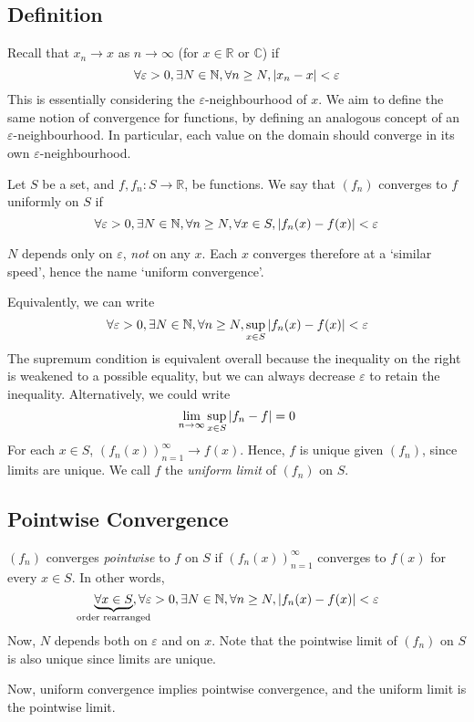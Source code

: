 \subsection{Definition}
Recall that \( x_n \to x \) as \( n \to \infty \) (for \( x \in \mathbb R\) or \(\mathbb C\)) if
\[ \forall \varepsilon > 0, \exists N \in \mathbb N, \forall n \geq N, \abs{x_n-x} < \varepsilon \]
This is essentially considering the \( \varepsilon \)-neighbourhood of \( x \).
We aim to define the same notion of convergence for functions, by defining an analogous concept of an \( \varepsilon \)-neighbourhood.
In particular, each value on the domain should converge in its own \( \varepsilon \)-neighbourhood.
\begin{definition}
Let \( S \) be a set, and \( f, f_n \colon S \to \mathbb R \), be functions.
We say that \( (f_n) \) converges to \( f \) uniformly on \( S \) if
\[ \forall \varepsilon > 0, \exists N \in \mathbb N, \forall n \geq N, \forall x \in S, \abs{f_n(x) - f(x)} < \varepsilon \]
\end{definition}
\begin{note}
\( N \) depends only on \( \varepsilon \), \textit{not} on any \( x \).
Each \( x \) converges therefore at a `similar speed', hence the name `uniform convergence'.
\end{note}
Equivalently, we can write
\[ \forall \varepsilon > 0, \exists N \in \mathbb N, \forall n \geq N, \sup_{x \in S} \abs{f_n(x) - f(x)} < \varepsilon \]
The supremum condition is equivalent overall because the inequality on the right is weakened to a possible equality, but we can always decrease \( \varepsilon \) to retain the inequality.
Alternatively, we could write
\[ \lim_{n \to \infty} \sup_{x \in S} \abs{f_n - f} = 0 \]
For each \( x \in S \), \( (f_n(x))_{n=1}^\infty \to f(x) \).
Hence, \( f \) is unique given \( (f_n) \), since limits are unique.
We call \( f \) the \textit{uniform limit} of \( (f_n) \) on \( S \).

\subsection{Pointwise Convergence}
\begin{definition}
\( (f_n) \) converges \textit{pointwise} to \( f \) on \( S \) if \( (f_n(x))_{n=1}^\infty \) converges to \( f(x) \) for every \( x \in S \).
In other words,
\[ \underbrace{\forall x \in S}_{\mathclap{\text{order rearranged}}}, \forall \varepsilon > 0, \exists N \in \mathbb N, \forall n \geq N, \abs{f_n(x) - f(x)} < \varepsilon \]
Now, \( N \) depends both on \( \varepsilon \) and on \( x \).
Note that the pointwise limit of \( (f_n) \) on \( S \) is also unique since limits are unique.
\end{definition}
Now, uniform convergence implies pointwise convergence, and the uniform limit is the pointwise limit.


